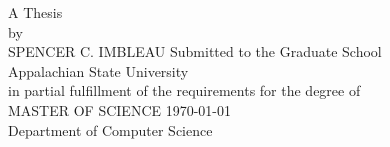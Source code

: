 \vfill
\begin{center}
\Large{\thesistitle}\normalsize
\vfill
A Thesis\\
by\\
SPENCER C. IMBLEAU
\vfill
Submitted to the Graduate School\\
Appalachian State University\\
in partial fulfillment of the requirements for the degree of\\
MASTER OF SCIENCE
\vfill
\today\\
Department of Computer Science
\end{center}
\vfill

\clearpage